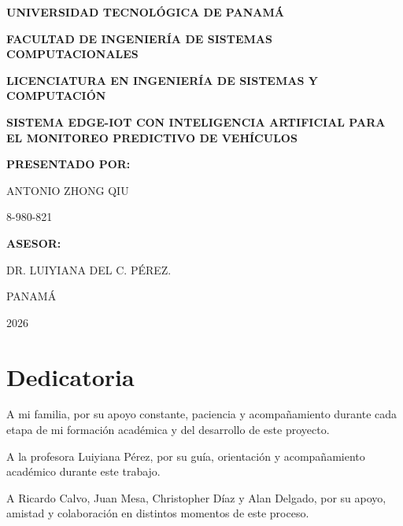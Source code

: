 \documentclass[12pt,letterpaper]{report}
\newcommand{\universidad}{UNIVERSIDAD TECNOLÓGICA DE PANAMÁ}
\newcommand{\facultad}{FACULTAD DE INGENIERÍA DE SISTEMAS COMPUTACIONALES}
\newcommand{\carrera}{LICENCIATURA EN INGENIERÍA DE SISTEMAS Y COMPUTACIÓN}
\newcommand{\titulo}{SISTEMA EDGE-IOT CON INTELIGENCIA ARTIFICIAL PARA EL MONITOREO PREDICTIVO DE VEHÍCULOS}
\newcommand{\autor}{ANTONIO ZHONG QIU}
\newcommand{\cedula}{8-980-821}
\newcommand{\asesor}{DR. LUIYIANA DEL C. PÉREZ.}
\newcommand{\lugar}{PANAMÁ}
\newcommand{\fecha}{2026}
\begin{document}
\hypersetup{pageanchor=false}
\begin{titlepage}
    \centering

    {\bfseries \universidad \par}
    \vspace{0.5cm}

    {\bfseries \facultad \par}
    \vspace{0.5cm}

    {\bfseries \carrera \par}

    \vfill

    {\bfseries\Large \titulo \par}

    \vfill

    {\bfseries PRESENTADO POR:\par}
    \vspace{0.3cm}
    {\autor \par}
    {\cedula \par}

    \vspace{1.5cm}

    {\bfseries ASESOR:\par}
    \vspace{0.3cm}
    {\asesor \par}

    \vfill

    {\lugar \par}
    {\fecha \par}

\end{titlepage}
\clearpage
\hypersetup{pageanchor=true}


\chapter*{Dedicatoria}

A mi familia, por su apoyo constante, paciencia y acompañamiento durante cada etapa de mi formación académica y del desarrollo de este proyecto.

A la profesora Luiyiana Pérez, por su guía, orientación y acompañamiento académico durante este trabajo.

A Ricardo Calvo, Juan Mesa, Christopher Díaz y Alan Delgado, por su apoyo, amistad y colaboración en distintos momentos de este proceso.
\end{document}
